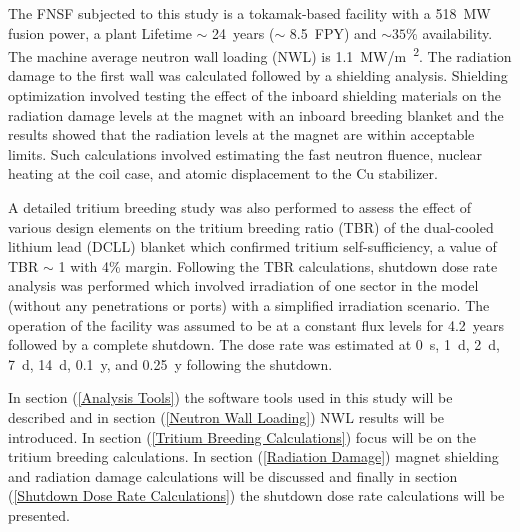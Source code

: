\documentclass[12pt, letterpaper]{elsarticle}
\begin{document}
The FNSF subjected to this study is a tokamak-based facility with a \SI{518}{MW} fusion power, a plant Lifetime $\sim$ \SI{24}{years} ($\sim$ \SI{8.5}{FPY}) and $\sim 35\%$ availability. The machine average neutron wall loading (NWL) is \SI{1.1}{MW/m\textsuperscript{2}}. The radiation damage to the first wall was calculated followed by a shielding analysis. Shielding optimization \cite{ref_2} involved testing the effect of the inboard shielding materials on the radiation damage levels at the magnet with an inboard breeding blanket and the results showed that the radiation levels at the magnet are within acceptable limits. Such calculations involved estimating the fast neutron fluence, nuclear heating at the coil case, and atomic displacement to the Cu stabilizer.\vspace{5mm}

A detailed tritium breeding study was also performed to assess the effect of various design elements on the tritium breeding ratio (TBR) of the dual-cooled lithium lead (DCLL) blanket which confirmed tritium self-sufficiency, a value of TBR $\sim$ 1 with 4\% margin. Following the TBR calculations, shutdown dose rate analysis was performed which involved irradiation of one sector in the model (without any penetrations or ports) with a simplified irradiation scenario. The operation of the facility was assumed to be at a constant flux levels for \SI{4.2}{years} followed by a complete shutdown. The dose rate was estimated at \SI{0}{s}, \SI{1}{d}, \SI{2}{d}, \SI{7}{d}, \SI{14}{d}, \SI{0.1}{y}, and \SI{0.25}{y} following the shutdown.\vspace{5mm}

In section (\ref{Analysis Tools}) the software tools used in this study will be described and in section (\ref{Neutron Wall Loading}) NWL results will be introduced. In section (\ref{Tritium Breeding Calculations}) focus will be on the tritium breeding calculations. In section (\ref{Radiation Damage}) magnet shielding and radiation damage calculations will be discussed and finally in section (\ref{Shutdown Dose Rate Calculations}) the shutdown dose rate calculations will be presented.
\end{document}
